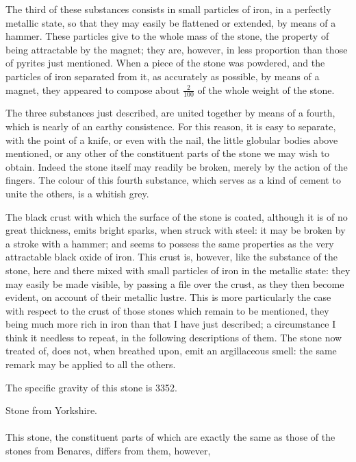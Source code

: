 \documentclass[a4paper, 12pt, oneside]{article}
\begin{document}
The third of these substances consists in small particles of iron, in a perfectly metallic state, so that they may easily be flattened or extended, by means of a hammer. These particles give to the whole mass of the stone, the property of being attractable by the magnet; they are, however, in less proportion than those of pyrites just mentioned. When a piece of the stone was powdered, and the particles of iron separated from it, as accurately as possible, by means of a magnet, they appeared to compose about $\frac{2}{100}$ of the whole weight of the stone.

The three substances just described, are united together by means of a fourth, which is nearly of an earthy consistence. For this reason, it is easy to separate, with the point of a knife, or even with the nail, the little globular bodies above mentioned, or any other of the constituent parts of the stone we may wish to obtain. Indeed the stone itself may readily be broken, merely by the action of the fingers. The colour of this fourth substance, which serves as a kind of cement to unite the others, is a whitish grey.

The black crust with which the surface of the stone is coated, although it is of no great thickness, emits bright sparks, when struck with steel: it may be broken by a stroke with a hammer; and seems to possess the same properties as the very attractable black oxide of iron. This crust is, however, like the substance of the stone, here and there mixed with small particles of iron in the metallic state: they may easily be made visible, by passing a file over the crust, as they then become evident, on account of their metallic lustre. This is more particularly the case with respect to the crust of those stones which remain to be mentioned, they being much more rich in iron than that I have just described; a circumstance I think it needless to repeat, in the following descriptions of them. The stone now treated of, does not, when breathed upon, emit an argillaceous smell: the same remark may be applied to all the others.

The specific gravity of this stone is 3352.
\begin{center}
Stone from Yorkshire.
\end{center}
\paragraph{}
This stone, the constituent parts of which are exactly the same as those of the stones from Benares, differs from them, however,
\end{document}
